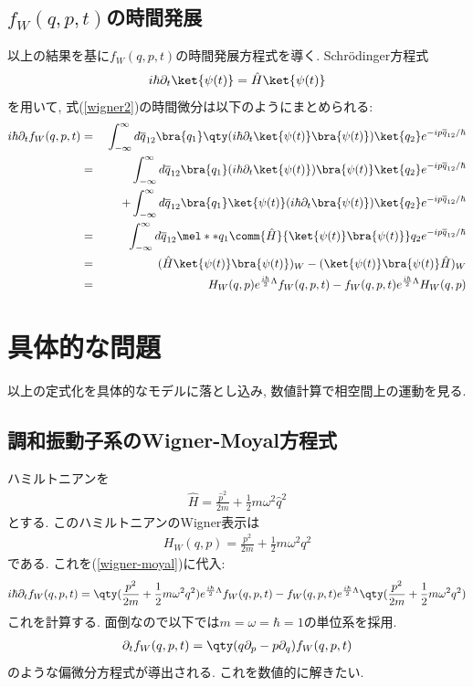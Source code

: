 \documentclass[10.5pt,a4paper]{jreport}
\begin{document}
\subsection{$f_W(q, p, t)$の時間発展}
以上の結果を基に$f_W(q, p, t)$の時間発展方程式を導く. Schr\"odinger方程式
\begin{eqnarray}
  i\hbar\partial_t\ket{\psi(t)} = \hat{H}\ket{\psi(t)}
\end{eqnarray}
を用いて, 式(\ref{wigner2})の時間微分は以下のようにまとめられる:
\begin{eqnarray}
  i\hbar\partial_tf_W(q, p, t) &=& \int_{-\infty}^{\infty} d\overline{q}_{12} \bra{q_1}\qty(i\hbar\partial_t\ket{\psi(t)}\bra{\psi(t)})\ket{q_2}e^{-ip\overline{q}_{12}/\hbar}\\
  \nonumber  &=& \int_{-\infty}^{\infty} d\overline{q}_{12} \bra{q_1}(i\hbar\partial_t\ket{\psi(t)})\bra{\psi(t)}\ket{q_2}e^{-ip\overline{q}_{12}/\hbar}\\
  &&\hspace{0.5cm} + \int_{-\infty}^{\infty} d\overline{q}_{12} \bra{q_1}\ket{\psi(t)}(i\hbar\partial_t\bra{\psi(t)})\ket{q_2}e^{-ip\overline{q}_{12}/\hbar}\\
  &=& \int_{-\infty}^{\infty} d\overline{q}_{12} \mel**{q_1}{\comm{\hat{H}}{\ket{\psi(t)}\bra{\psi(t)}}}{q_2}e^{-ip\overline{q}_{12}/\hbar}\\
  &=& (\hat{H}\ket{\psi(t)}\bra{\psi(t)})_W - (\ket{\psi(t)}\bra{\psi(t)}\hat{H})_W\\
  &=& H_W(q, p)e^{\frac{i\hbar}{2}\Lambda}f_W(q, p, t) - f_W(q, p, t)e^{\frac{i\hbar}{2}\Lambda}H_W(q, p)\label{wigner-moyal}
\end{eqnarray}
\section{具体的な問題}
以上の定式化を具体的なモデルに落とし込み, 数値計算で相空間上の運動を見る.
\subsection{調和振動子系のWigner-Moyal方程式}
ハミルトニアンを
\begin{eqnarray}
  \hat{H} = \frac{\hat{p}^2}{2m} + \frac{1}{2}m\omega^2\hat{q}^2
\end{eqnarray}
とする. このハミルトニアンのWigner表示は
\begin{eqnarray}
  H_W(q, p) = \frac{p^2}{2m} + \frac{1}{2}m\omega^2q^2
\end{eqnarray}
である. これを(\ref{wigner-moyal})に代入:
\begin{eqnarray}
  i\hbar\partial_tf_W(q, p, t) = \qty(\frac{p^2}{2m} + \frac{1}{2}m\omega^2q^2)e^{\frac{i\hbar}{2}\Lambda}f_W(q, p, t) - f_W(q, p, t)e^{\frac{i\hbar}{2}\Lambda}\qty(\frac{p^2}{2m} + \frac{1}{2}m\omega^2q^2)
\end{eqnarray}
これを計算する. 面倒なので以下では$m = \omega = \hbar = 1$の単位系を採用.  
\begin{eqnarray}
  \partial_t f_W(q, p, t) = \qty(q\partial_p - p\partial_q)f_W(q, p, t)\label{wigner-moyal2}
\end{eqnarray}
のような偏微分方程式が導出される. これを数値的に解きたい.
\end{document}
